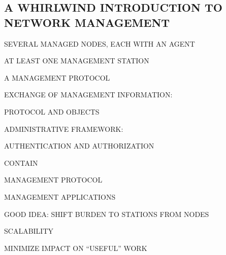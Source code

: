 \begin{bwslide}
\part	{A WHIRLWIND INTRODUCTION TO\\ NETWORK MANAGEMENT}\bf

\begin{nrtc}
\item	SEVERAL MANAGED NODES, EACH WITH AN AGENT

\item	AT LEAST ONE MANAGEMENT STATION

\item	A MANAGEMENT PROTOCOL
\end{nrtc}
\end{bwslide}


\begin{bwslide}

\begin{nrtc}
\item	EXCHANGE OF MANAGEMENT INFORMATION:
    \begin{nrtc}
    \item	 PROTOCOL AND OBJECTS
    \end{nrtc}

\item	ADMINISTRATIVE FRAMEWORK:
    \begin{nrtc}
    \item	AUTHENTICATION AND AUTHORIZATION
    \end{nrtc}
\end{nrtc}
\end{bwslide}




\begin{bwslide}

\begin{nrtc}
\item	CONTAIN
    \begin{nrtc}
    \item	MANAGEMENT PROTOCOL

    \item	MANAGEMENT APPLICATIONS
    \end{nrtc}

\item	GOOD IDEA: SHIFT BURDEN TO STATIONS FROM NODES
    \begin{nrtc}
    \item	SCALABILITY

    \item	MINIMIZE IMPACT ON ``USEFUL'' WORK
    \end{nrtc}
\end{nrtc}
\end{bwslide}


